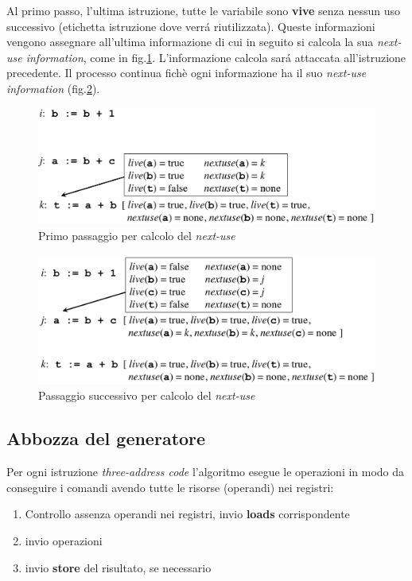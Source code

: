 Al primo passo, l'ultima istruzione, tutte le variabile sono \textbf{vive}
senza nessun uso successivo (etichetta istruzione dove verr\'a riutilizzata).
Queste informazioni vengono assegnare all'ultima informazione di cui in seguito
si calcola la sua \textit{next-use information}, come in
fig.\ref{img:next-use}. L'informazione calcola sar\'a attaccata all'istruzione
precedente. Il processo continua fich\`e ogni informazione ha il suo
\textit{next-use information} (fig.\ref{img:second_step_next-use}).

\begin{figure}[H]
\includegraphics[scale=0.4]{res/image/next-use}
\caption{Primo passaggio per calcolo del \textit{next-use}}
\label{img:next-use}
\end{figure}

\begin{figure}[H]
\includegraphics[scale=0.4]{res/image/second_step_next-use}
\caption{Passaggio successivo per calcolo del \textit{next-use}}
\label{img:second_step_next-use}
\end{figure}

\subsection{Abbozza del generatore}
Per ogni istruzione \textit{three-address code} l'algoritmo esegue le
operazioni in modo da conseguire i comandi avendo tutte le risorse (operandi)
nei registri:
\begin{enumerate}
\item Controllo assenza operandi nei registri, invio \textbf{loads}
corrispondente
\item invio operazioni
\item invio \textbf{store} del risultato, se necessario
\end{enumerate}

